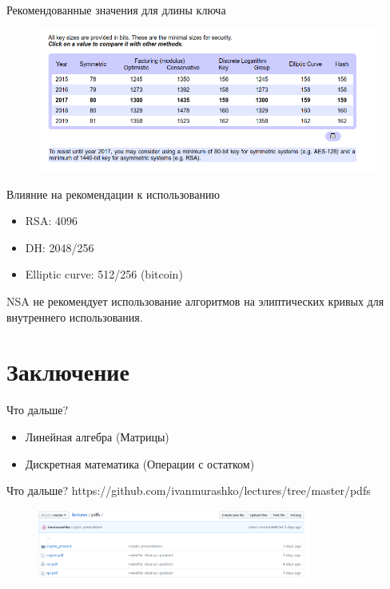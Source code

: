 \documentclass[10pt,pdf,hyperref={unicode}]{beamer}
\begin{document}
\begin{frame}{Рекомендованные значения для длины ключа}
 \begin{figure} 
   \includegraphics[width=120mm,scale=0.5]{keylengthcom.png}
  \end{figure}
\end{frame}

\begin{frame}{Влияние на рекомендации к использованию}
\begin{itemize}
\item RSA: 4096
\item DH: 2048/256
\item Elliptic curve: 512/256 (bitcoin) 
\end{itemize}

NSA не рекомендует использование алгоритмов на элиптических кривых для
внутреннего использования.
\end{frame}

\section{Заключение}
\begin{frame}{Что дальше?}
\begin{itemize}
\item Линейная алгебра (Матрицы)
\item Дискретная математика (Операции с остатком)
\end{itemize}
\end{frame}

\begin{frame}{Что дальше?}
https://github.com/ivanmurashko/lectures/tree/master/pdfs
 \begin{figure} 
   \includegraphics[width=90mm,scale=0.5]{github.png}
  \end{figure}
\end{frame}
\end{document}
